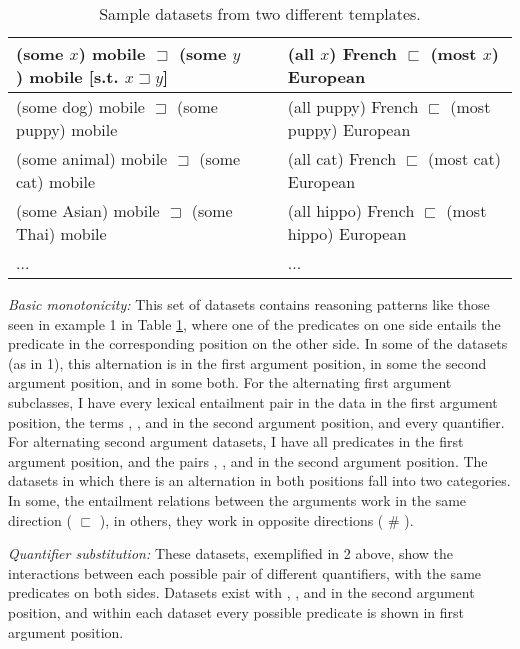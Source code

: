 \begin{table}\small\centering
\begin{tabular}{|ll|l|}
\hline
\textbf{(some $x$) mobile $\sqsupset$ (some $y$) mobile [s.t. $x\sqsupset y$]}&~&\textbf{(all $x$) French $\sqsubset$ (most $x$) European}		
\\\hline
(some dog) mobile	 $\sqsupset$  (some puppy) mobile	&&
(all puppy) French $\sqsubset$ (most puppy) European
\\
(some animal) mobile $\sqsupset$ (some cat) mobile&&
(all cat) French $\sqsubset$ (most cat) European 		\\
	
(some Asian) mobile $\sqsupset$ (some Thai) mobile&&(all hippo) French $\sqsubset$ (most hippo) European \\ ...&&...\\\hline
\end{tabular}
\caption{Sample datasets from two different templates.\label{examplesofdata}}
\end{table}



\noindent\textit{Basic monotonicity:} This set of datasets contains reasoning patterns like those seen in example 1  in Table \ref{examplesofdata}, where one of the predicates on one side entails the predicate in the corresponding position on the other side. In some of the datasets (as in 1), this alternation is in the first argument position, in some the second argument position, and in some both. For the alternating first argument subclasses, I have every lexical entailment pair in the data in the first argument position, the terms , , and  in the second argument position, and every quantifier. 
For alternating second argument datasets, I have all predicates in the first argument position, and the pairs , , and  in the second argument position. The datasets in which there is an alternation in both positions fall into two categories. In some, the entailment relations between the arguments work in the same direction ( $\sqsubset$ ), in others, they work in opposite directions ( \# ).

\noindent\textit{Quantifier substitution:} These datasets, exemplified in 2 above, show the interactions between each possible pair of different quantifiers, with the same predicates on both sides. Datasets exist with , , and  in the second argument position, and within each dataset every possible predicate is shown in first argument position.

